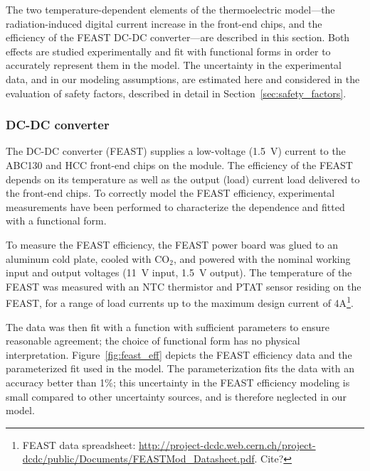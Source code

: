
The two temperature-dependent elements of the thermoelectric model---the
radiation-induced digital current increase in the front-end chips, and the
efficiency of the FEAST DC-DC converter---are described in this section.
Both effects are studied experimentally and fit with functional forms
in order to accurately represent them in the model.
The uncertainty in the experimental data, and in our modeling assumptions,
are estimated here and considered in the evaluation of safety factors,
described in detail in Section~\ref{sec:safety_factors}.

\subsubsection{DC-DC converter}

The DC-DC converter (FEAST) supplies a low-voltage (1.5~V) current to the ABC130 and HCC front-end
chips on the module.
The efficiency of the FEAST depends on its temperature as well as the output (load) current
load delivered to the front-end chips. To correctly model the FEAST efficiency, experimental
measurements have been performed to characterize the dependence and fitted with a functional form.

To measure the FEAST efficiency, the FEAST power board was glued to an aluminum cold plate, cooled
with CO$_2$, and powered with the nominal working input and output voltages (11~V input, 1.5~V output).
The temperature of the FEAST was measured with an NTC thermistor and PTAT sensor residing on the FEAST,
for a range of load currents up to the maximum design current of 4A\footnote
{
FEAST data spreadsheet: \url{http://project-dcdc.web.cern.ch/project-dcdc/public/Documents/FEASTMod_Datasheet.pdf}.
Cite?
}.

The data was then fit with a function with sufficient parameters to ensure reasonable agreement; the
choice of functional form has no physical interpretation. Figure~\ref{fig:feast_eff} depicts the
FEAST efficiency data and the parameterized fit used in the model. The parameterization fits the data
with an accuracy better than 1\%; this uncertainty in the FEAST efficiency modeling is small
compared to other uncertainty sources, and is therefore neglected in our model.


